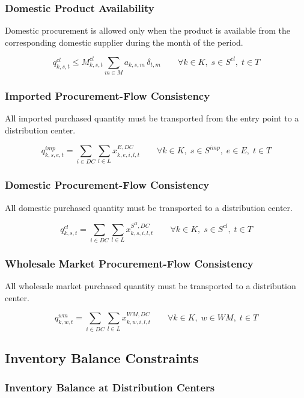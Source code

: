 \documentclass[12pt]{article}
\begin{document}
\subsubsection{Domestic Product Availability}

Domestic procurement is allowed only when the product is available from the corresponding domestic supplier during the month of the period.

\[
q^{cl}_{k,s,t}
\leq
M^{cl}_{k,s,t}
\sum_{m \in M} a_{k,s,m}\,\delta_{t,m}
\qquad
\forall k \in K,\; s \in S^{cl},\; t \in T
\]

\subsubsection{Imported Procurement-Flow Consistency}

All imported purchased quantity must be transported from the entry point to a distribution center.

\[
q^{imp}_{k,s,e,t}
=
\sum_{i \in DC}\sum_{l \in L} x^{E,DC}_{k,e,i,l,t}
\qquad
\forall k \in K,\; s \in S^{imp},\; e \in E,\; t \in T
\]

\subsubsection{Domestic Procurement-Flow Consistency}

All domestic purchased quantity must be transported to a distribution center.

\[
q^{cl}_{k,s,t}
=
\sum_{i \in DC}\sum_{l \in L} x^{S^{cl},DC}_{k,s,i,l,t}
\qquad
\forall k \in K,\; s \in S^{cl},\; t \in T
\]

\subsubsection{Wholesale Market Procurement-Flow Consistency}

All wholesale market purchased quantity must be transported to a distribution center.

\[
q^{wm}_{k,w,t}
=
\sum_{i \in DC}\sum_{l \in L} x^{WM,DC}_{k,w,i,l,t}
\qquad
\forall k \in K,\; w \in WM,\; t \in T
\]

\subsection{Inventory Balance Constraints}

\subsubsection{Inventory Balance at Distribution Centers}
\end{document}
